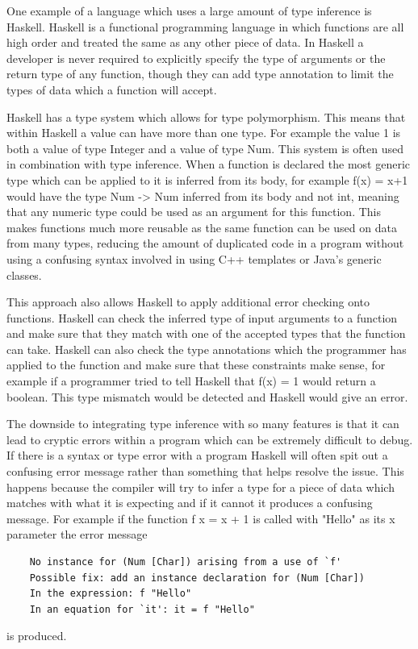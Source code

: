 \documentclass[]{final_report}
\begin{document}
One example of a language which uses a large amount of type inference is Haskell. Haskell is a functional programming language in which functions are all high order and treated the same as any other piece of data. In Haskell a developer is never required to explicitly specify the type of arguments or the return type of any function, though they can add type annotation to limit the types of data which a function will accept.

Haskell has a type system which allows for type polymorphism. This means that within Haskell a value can have more than one type. For example the value 1 is both a value of type Integer and a value of type Num. This system is often used in combination with type inference. When a function is declared the most generic type which can be applied to it is inferred from its body, for example f(x) = x+1 would have the type Num -> Num inferred from its body and not int, meaning that any numeric type could be used as an argument for this function. This makes functions much more reusable as the same function can be used on data from many types, reducing the amount of duplicated code in a program without using a confusing syntax involved in using C++ templates or Java's generic classes.
 
This approach also allows Haskell to apply additional error checking onto functions. Haskell can check the inferred type of input arguments to a function and make sure that they match with one of the accepted types that the function can take. Haskell can also check the type annotations which the programmer has applied to the function and make sure that these constraints make sense, for example if a programmer tried to tell Haskell that f(x) = 1 would return a boolean. This type mismatch would be detected and Haskell would give an error.

The downside to integrating type inference with so many features is that it can lead to cryptic errors within a program which can be extremely difficult to debug. If there is a syntax or type error with a program Haskell will often spit out a confusing error message rather than something that helps resolve the issue. This happens because the compiler will try to infer a type for a piece of data which matches with what it is expecting and if it cannot it produces a confusing message. For example if the function f x = x + 1 is called with "Hello" as its x parameter the error message
\begin{verbatim}
    No instance for (Num [Char]) arising from a use of `f'
    Possible fix: add an instance declaration for (Num [Char])
    In the expression: f "Hello"
    In an equation for `it': it = f "Hello"
\end{verbatim}
is produced. 
\end{document}
